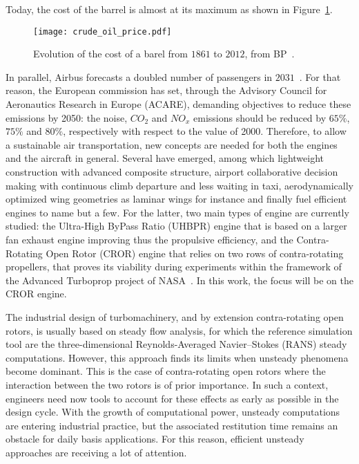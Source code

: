 Today, the cost of the barrel is almost at its maximum as shown
in Figure~\ref{fig:crude_oil_price}.
\begin{figure}[htp]
  \centering
  \texttt{[image: crude\_oil\_price.pdf]}
  \caption{Evolution of the cost of a barel from $1861$ to $2012$, from BP~\cite{bpreview2013}.}
  \label{fig:crude_oil_price}
\end{figure}
In parallel, Airbus forecasts a doubled number of passengers in
$2031$~\cite{AirbusForecast2013}. For that reason, the European commission has set, through the
Advisory Council for Aeronautics Research in Europe (ACARE),
demanding objectives to reduce these emissions by 2050:
the noise, $CO_2$ and $NO_x$ emissions should be reduced by 
$65\%$, $75\%$ and $80\%$, respectively with respect to
the value of 2000.
Therefore, to allow a sustainable air transportation, new
concepts are needed for both the engines and the 
aircraft in general.
Several have emerged, among which lightweight construction
with advanced composite structure, airport collaborative decision
making with continuous climb departure and less waiting in taxi,
aerodynamically optimized wing geometries as laminar wings for instance
and finally fuel efficient engines to name but a few.
For the latter, two main types of engine are currently studied: the
Ultra-High ByPass Ratio (UHBPR) engine that is based on a
larger fan exhaust engine improving thus the
propulsive efficiency, and the Contra-Rotating Open Rotor (CROR)
engine that relies on two rows of contra-rotating propellers,
that proves its viability during experiments within the framework of
the Advanced Turboprop project of NASA~\cite{Hager1988}.
In this work, the focus will be on the CROR engine.
\newline 

The industrial design of turbomachinery, and by extension contra-rotating
open rotors, is usually based on steady flow analysis, 
for which the reference simulation tool are the three-dimensio\-nal Reynolds-Averaged 
Navier--Stokes (RANS) steady computations. However, this approach finds its limits 
when unsteady phenomena become dominant. This is the case of 
contra-rotating open rotors where the interaction between the
two rotors is of prior importance. 
In such a
context, engineers need now tools to account for these effects as
early as possible in the design cycle. With the growth of
computational power, unsteady computations are entering industrial
practice, but the associated restitution time remains an obstacle for
daily basis applications.  For this reason, efficient
unsteady approaches are receiving a lot of attention. 

